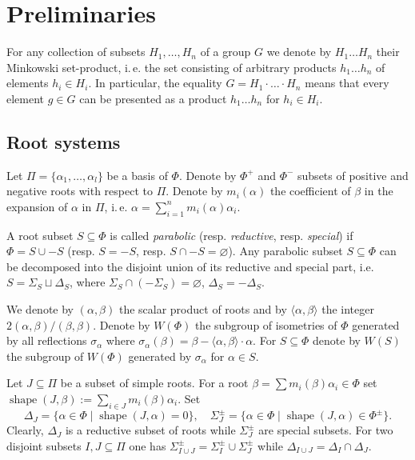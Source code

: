 \documentclass[12pt]{amsart}
\numberwithin{equation}{section}
\theoremstyle{definition}
\DeclareMathOperator{\shape}{shape}
\begin{document}
\section{Preliminaries}\label{sec:prelim}
For any collection of subsets $H_1,\ldots, H_n$ of a group $G$ we denote by $H_1\ldots H_n$ their Minkowski set-product,
i.\,e. the set consisting of arbitrary products $h_1\ldots h_n$ of elements $h_i\in H_i$. In particular, the equality
$G = H_1\cdot\ldots\cdot H_n$ means that every element $g\in G$ can be presented as a product $h_1\ldots h_n$ for $h_i\in H_i$.

\subsection{Root systems}\label{sec:rootsys}
Let $\Pi=\{\alpha_1, \ldots, \alpha_l\}$ be a basis of $\Phi$. Denote by $\Phi^+$ and $\Phi^-$ subsets of positive and negative roots with respect to $\Pi$.
Denote by $m_i(\alpha)$ the coefficient of $\beta$ in the expansion of $\alpha$ in $\Pi$, i.\,e. $\alpha = \sum_{i=1}^n m_i(\alpha) \alpha_i$.

A root subset $S\subseteq \Phi$ is called {\it parabolic} (resp. {\it reductive}, resp. {\it special}) if $\Phi=S \cup -S$ (resp. $S = -S$, resp. $S \cap -S=\varnothing$).
Any parabolic subset $S \subseteq \Phi$ can be decomposed into the disjoint union of its reductive and special part, i.e. 
$S = \Sigma_S \sqcup \Delta_S$, where $\Sigma_S \cap (-\Sigma_S) = \varnothing$, $\Delta_S = -\Delta_S$.

We denote by $(\alpha, \beta)$ the scalar product of roots and by $\langle \alpha, \beta\rangle$ the integer $2(\alpha, \beta)/(\beta, \beta)$.
Denote by $W(\Phi)$ the subgroup of isometries of $\Phi$ generated by all reflections $\sigma_\alpha$ where $\sigma_\alpha(\beta)=\beta-\langle\alpha,\beta \rangle\cdot \alpha$.
For $S\subseteq \Phi$ denote by $W(S)$ the subgroup of $W(\Phi)$ generated by $\sigma_\alpha$ for $\alpha\in S$.

Let $J\subseteq \Pi$ be a subset of simple roots. 
For a root $\beta = \sum m_i(\beta)\alpha_i \in \Phi$ set $\shape(J, \beta):=\sum\limits_{i\in J} m_i(\beta) \alpha_i$.
Set $$\Delta_J = \{\alpha \in \Phi \mid \shape(J, \alpha)=0\},\quad \Sigma^\pm_J = \{\alpha \in \Phi \mid \shape(J, \alpha)\in\Phi^\pm \}.$$
Clearly, $\Delta_J$ is a reductive subset of roots while $\Sigma^\pm_J$ are special subsets.
For two disjoint subsets $I, J\subseteq \Pi$ one has $\Sigma^\pm_{I \cup J} = \Sigma^\pm_I\cup\Sigma^\pm_J$ while $\Delta_{I\cup J} = \Delta_I \cap \Delta_J$.
\end{document}
